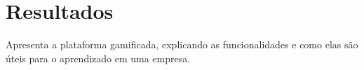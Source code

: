 \chapter{Resultados}
\label{chap:resultados}

Apresenta a plataforma gamificada, explicando as funcionalidades e como elas são úteis para o aprendizado em uma empresa.
 
